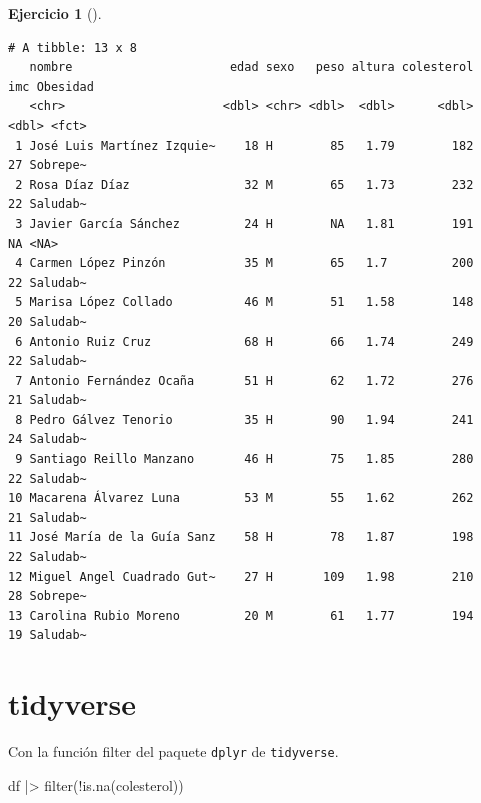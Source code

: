 \documentclass[
  spanish,
  a4paper,
]{scrreport}
\newenvironment{Shaded}{\begin{snugshade}}{\end{snugshade}}
\newcommand{\FunctionTok}[1]{\textcolor[rgb]{0.28,0.35,0.67}{#1}}
\newcommand{\NormalTok}[1]{\textcolor[rgb]{0.00,0.23,0.31}{#1}}
\newcommand{\SpecialCharTok}[1]{\textcolor[rgb]{0.37,0.37,0.37}{#1}}
\theoremstyle{definition}
\newtheorem{exercise}{Ejercicio}[chapter]
\theoremstyle{remark}
\begin{document}
\begin{exercise}[]
\begin{enumerate}
\begin{tcolorbox}
\begin{Shaded}
\end{Shaded}

\begin{verbatim}
# A tibble: 13 x 8
   nombre                      edad sexo   peso altura colesterol   imc Obesidad
   <chr>                      <dbl> <chr> <dbl>  <dbl>      <dbl> <dbl> <fct>   
 1 José Luis Martínez Izquie~    18 H        85   1.79        182    27 Sobrepe~
 2 Rosa Díaz Díaz                32 M        65   1.73        232    22 Saludab~
 3 Javier García Sánchez         24 H        NA   1.81        191    NA <NA>    
 4 Carmen López Pinzón           35 M        65   1.7         200    22 Saludab~
 5 Marisa López Collado          46 M        51   1.58        148    20 Saludab~
 6 Antonio Ruiz Cruz             68 H        66   1.74        249    22 Saludab~
 7 Antonio Fernández Ocaña       51 H        62   1.72        276    21 Saludab~
 8 Pedro Gálvez Tenorio          35 H        90   1.94        241    24 Saludab~
 9 Santiago Reillo Manzano       46 H        75   1.85        280    22 Saludab~
10 Macarena Álvarez Luna         53 M        55   1.62        262    21 Saludab~
11 José María de la Guía Sanz    58 H        78   1.87        198    22 Saludab~
12 Miguel Angel Cuadrado Gut~    27 H       109   1.98        210    28 Sobrepe~
13 Carolina Rubio Moreno         20 M        61   1.77        194    19 Saludab~
\end{verbatim}

  \section{tidyverse}

  Con la función filter del paquete \texttt{dplyr} de
  \texttt{tidyverse}.

\begin{Shaded}
\begin{Highlighting}[]
\NormalTok{df }\SpecialCharTok{|\textgreater{}} \FunctionTok{filter}\NormalTok{(}\SpecialCharTok{!}\FunctionTok{is.na}\NormalTok{(colesterol))}
\end{Highlighting}
\end{Shaded}


\end{tcolorbox}
\end{enumerate}
\end{exercise}
\end{document}
